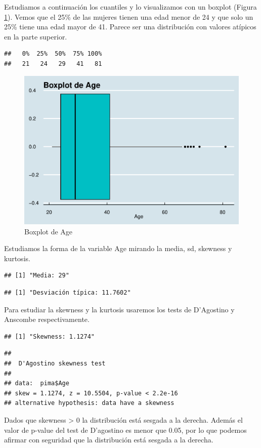 \documentclass[
]{article}
\begin{document}
Estudiamos a continuación los cuantiles y lo visualizamos con un boxplot
(Figura \ref{fig:box_age}). Vemos que el 25\% de las mujeres tienen una
edad menor de 24 y que solo un 25\% tiene una edad mayor de 41. Parece
ser una distribución con valores atípicos en la parte superior.

\begin{verbatim}
##   0%  25%  50%  75% 100% 
##   21   24   29   41   81
\end{verbatim}

\begin{figure}

{\centering \includegraphics[width=0.5\linewidth]{pima-clasificacion_files/figure-latex/box_age-1} 

}

\caption{Boxplot de Age}\label{fig:box_age}
\end{figure}

Estudiamos la forma de la variable Age mirando la media, sd, skewness y
kurtosis.

\begin{verbatim}
## [1] "Media: 29"
\end{verbatim}

\begin{verbatim}
## [1] "Desviación típica: 11.7602"
\end{verbatim}

Para estudiar la skewness y la kurtosis usaremos los tests de D'Agostino
y Anscombe respectivamente.

\begin{verbatim}
## [1] "Skewness: 1.1274"
\end{verbatim}

\begin{verbatim}
## 
##  D'Agostino skewness test
## 
## data:  pima$Age
## skew = 1.1274, z = 10.5504, p-value < 2.2e-16
## alternative hypothesis: data have a skewness
\end{verbatim}

Dados que skewness \textgreater{} 0 la distribución está sesgada a la
derecha. Además el valor de p-value del test de D'agostino es menor que
0.05, por lo que podemos afirmar con seguridad que la distribución está
sesgada a la derecha.
\end{document}
